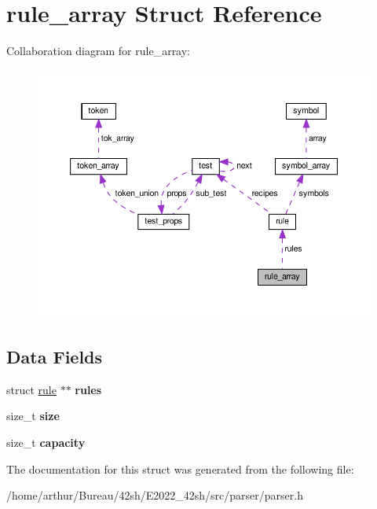 \hypertarget{structrule__array}{}\section{rule\+\_\+array Struct Reference}
\label{structrule__array}


Collaboration diagram for rule\+\_\+array\+:
\nopagebreak
\begin{figure}[H]
\begin{center}
\leavevmode
\includegraphics[width=350pt]{structrule__array__coll__graph}
\end{center}
\end{figure}
\subsection*{Data Fields}
\begin{DoxyCompactItemize}
\item 
\mbox{\label{structrule__array_a282103c2275ce6e1ae4d02b4698709dd}} 
struct \hyperlink{structrule}{rule} $\ast$$\ast$ {\bfseries rules}
\item 
\mbox{\label{structrule__array_a854352f53b148adc24983a58a1866d66}} 
size\+\_\+t {\bfseries size}
\item 
\mbox{\label{structrule__array_ad721fc6ca6a3d6ba3bc506576622aab0}} 
size\+\_\+t {\bfseries capacity}
\end{DoxyCompactItemize}


The documentation for this struct was generated from the following file\+:\begin{DoxyCompactItemize}
\item 
/home/arthur/\+Bureau/42sh/\+E2022\+\_\+42sh/src/parser/parser.\+h\end{DoxyCompactItemize}
